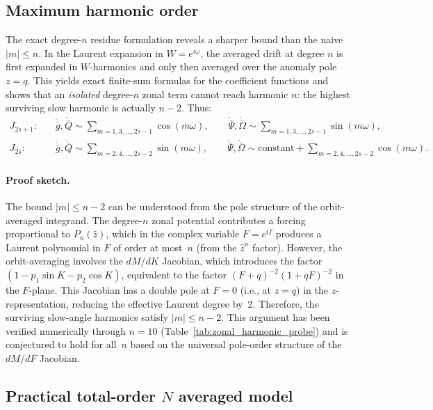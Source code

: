 \documentclass[11pt]{article}
\begin{document}
\subsection{Maximum harmonic order}
\label{sec:harmonic_bound}

The exact degree-$n$ residue formulation reveals a sharper bound than the
naive $|m| \le n$. In the Laurent expansion in $W = e^{i\omega}$, the
averaged drift at degree $n$ is first expanded in $W$-harmonics and only
then averaged over the anomaly pole $z = q$. This yields exact finite-sum
formulas for the coefficient functions and shows that an \emph{isolated}
degree-$n$ zonal term cannot reach harmonic $n$: the highest surviving slow
harmonic is actually $n-2$. Thus:
\begin{equation}
\begin{aligned}
J_{2s+1}:&\quad
\dot{\bar g},\dot{\bar Q}
\sim \sum_{m=1,3,\dots,2s-1}\cos(m\omega),\qquad
\dot{\bar\Psi},\dot{\bar\Omega}
\sim \sum_{m=1,3,\dots,2s-1}\sin(m\omega),\\
J_{2s}:&\quad
\dot{\bar g},\dot{\bar Q}
\sim \sum_{m=2,4,\dots,2s-2}\sin(m\omega),\qquad
\dot{\bar\Psi},\dot{\bar\Omega}
\sim \text{constant}+\sum_{m=2,4,\dots,2s-2}\cos(m\omega).
\end{aligned}
\end{equation}

\paragraph{Proof sketch.}
The bound $|m| \le n-2$ can be understood from the pole structure of the
orbit-averaged integrand. The degree-$n$ zonal potential contributes a
forcing proportional to $P_n(\hat z)$, which in the complex variable
$F = e^{if}$ produces a Laurent polynomial in $F$ of order at most~$n$
(from the $\hat z^n$ factor). However, the orbit-averaging involves the
$dM/dK$ Jacobian, which introduces the factor $(1-p_1\sin K - p_2\cos K)$,
equivalent to the factor $(F+q)^{-2}(1+qF)^{-2}$ in the $F$-plane. This
Jacobian has a double pole at $F = 0$ (i.e., at $z = q$) in the
$z$-representation, reducing the effective Laurent degree by~2. Therefore,
the surviving slow-angle harmonics satisfy $|m| \le n - 2$. This argument
has been verified numerically through $n = 10$
(Table~\ref{tab:zonal_harmonic_probe}) and is conjectured to hold for all~$n$
based on the universal pole-order structure of the $dM/dF$ Jacobian.

\subsection{Practical total-order \texorpdfstring{$N$}{N} averaged model}
\end{document}
